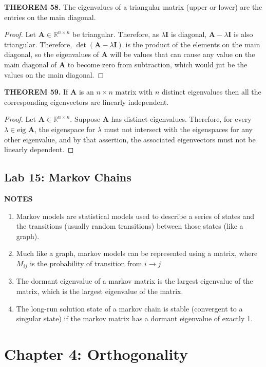 \documentclass[12pt]{article}
\newcommand{\mat}[1]{\mathbf{#1}}
\newcommand{\theorem}[2]{\textbf{THEOREM #1.} #2}
\newcommand{\notes}{\textbf{NOTES}}
\newcommand{\eig}{\text{eig }}
\begin{document}
\theorem{58}{The eigenvalues of a triangular matrix (upper or lower) are the entries on the main diagonal.}

\begin{proof}
Let $\mat{A} \in \mathbb{R}^{n \times n}$ be triangular. Therefore, as $\lambda \mat{I}$ is diagonal, $\mat{A} - \lambda \mat{I}$ is also triangular. Therefore, $\det(\mat{A} - \lambda \mat{I})$ is the product of the elements on the main diagonal, so the eigenvalues of $\mat{A}$ will be values that can cause any value on the main diagonal of $\mat{A}$ to become zero from subtraction, which would jut be the values on the main diagonal.   
\end{proof}

\theorem{59}{If $\mat{A}$ is an $n \times n$ matrix with $n$ distinct eigenvalues then all the corresponding eigenvectors are linearly independent.}

\begin{proof}
Let $\mat{A} \in \mathbb{R}^{n \times n}$. Suppose $\mat{A}$ has distinct eigenvalues. Therefore, for every $\lambda \in \eig \mat{A}$, the eigenspace for $\lambda$ must not intersect with the eigenspaces for any other eigenvalue, and by that assertion, the associated eigenvectors must not be linearly dependent.
\end{proof}

\subsection{Lab 15: Markov Chains}

\notes

\begin{enumerate}
\item Markov models are statistical models used to describe a series of states and the transitions (usually random transitions) between those states (like a graph).
\item Much like a graph, markov models can be represented using a matrix, where $M_{ij}$ is the probability of transition from $i \to j$.
\item The dormant eigenvalue of a markov matrix is the largest eigenvalue of the matrix, which is the largest eigenvalue of the matrix.
\item The long-run solution state of a markov chain is stable (convergent to a singular state) if the markov matrix has a dormant eigenvalue of exactly 1. 
\end{enumerate}

\section{Chapter 4: Orthogonality}
\end{document}
